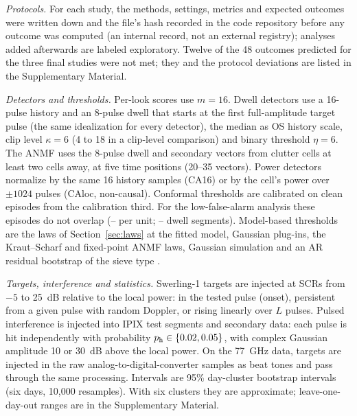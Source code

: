 \documentclass[journal]{IEEEtran}
\begin{document}
\emph{Protocols.} For each study, the methods, settings, metrics and expected outcomes were written down and the file's hash recorded in the code repository before any outcome was computed (an internal record, not an external registry); analyses added afterwards are labeled exploratory. Twelve of the 48 outcomes predicted for the three final studies were not met; they and the protocol deviations are listed in the Supplementary Material.

\emph{Detectors and thresholds.} Per-look scores use $m=16$. Dwell detectors use a 16-pulse history and an 8-pulse dwell that starts at the first full-amplitude target pulse (the same idealization for every detector), the median as OS history scale, clip level $\kappa=6$ (4 to 18 in a clip-level comparison) and binary threshold $\eta=6$. The ANMF uses the 8-pulse dwell and secondary vectors from clutter cells at least two cells away, at five time positions (20--35 vectors). Power detectors normalize by the same 16 history samples (CA16) or by the cell's power over $\pm1024$ pulses (CAloc, non-causal). Conformal thresholds are calibrated on clean episodes from the calibration third. For the low-false-alarm analysis these episodes do not overlap (\LowCalMin--\LowCalMax{} per unit; \DwellCalMin--\DwellCalMax{} dwell segments). Model-based thresholds are the laws of Section~\ref{sec:laws} at the fitted model, Gaussian plug-ins, the Kraut--Scharf and fixed-point ANMF laws, Gaussian simulation and an AR residual bootstrap of the sieve type \cite{qu2024sieve}.

\emph{Targets, interference and statistics.} Swerling-1 targets are injected at SCRs from $-5$ to 25~dB relative to the local power: in the tested pulse (onset), persistent from a given pulse with random Doppler, or rising linearly over $L$ pulses. Pulsed interference is injected into IPIX test segments and secondary data: each pulse is hit independently with probability $p_{\rm h}\in\{0.02,0.05\}$, with complex Gaussian amplitude 10 or 30~dB above the local power. On the 77~GHz data, targets are injected in the raw analog-to-digital-converter samples as beat tones and pass through the same processing. Intervals are 95\% day-cluster bootstrap intervals (six days, 10,000 resamples). With six clusters they are approximate; leave-one-day-out ranges are in the Supplementary Material.
\end{document}
